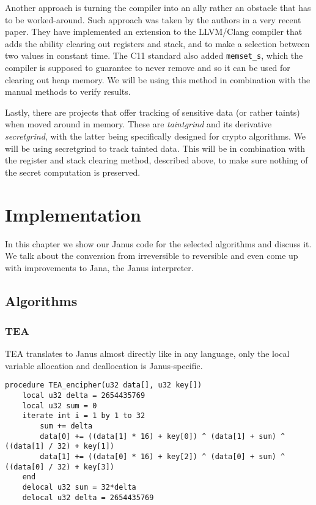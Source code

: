 \documentclass[a4paper,10pt,openright]{memoir}
\newcommand{\term}[1]{\textit{#1}}
\newcommand{\code}[1]{\texttt{#1}}
\begin{document}
Another approach is turning the compiler into an ally rather an 
obstacle that has to be worked-around. Such approach was taken by the 
authors in a very recent paper\cite{whatyouc}. They have implemented an 
extension to the LLVM/Clang compiler that adds the ability clearing out 
registers and stack, and to make a selection between two values in 
constant time. The C11 standard also added \code{memset\_s}, which the 
compiler is supposed to guarantee to never remove and so it can be used 
for clearing out heap memory. We will be using this method in 
combination with the manual methods to verify results.

Lastly, there are projects that offer tracking of sensitive data (or 
rather taints) when moved 
around in memory. These are \term{taintgrind} and its derivative 
\term{secretgrind}, with the latter being specifically designed for 
crypto algorithms. We will be using secretgrind to track tainted data. 
This will be in combination with the register and stack clearing 
method, described above, to make sure nothing of the secret computation 
is preserved.



\chapter{Implementation}

In this chapter we show our Janus code for the selected algorithms and 
discuss it. We talk about the conversion from irreversible to 
reversible and even come up with improvements to Jana, the Janus 
interpreter.


\section{Algorithms}

\subsection{TEA}
\label{sec:impl:tea}

TEA translates to Janus almost directly like in any language, only the 
local variable allocation and deallocation is Janus-specific.

\begin{lstlisting}[language=Janus]
procedure TEA_encipher(u32 data[], u32 key[])
    local u32 delta = 2654435769
    local u32 sum = 0
    iterate int i = 1 by 1 to 32
        sum += delta
        data[0] += ((data[1] * 16) + key[0]) ^ (data[1] + sum) ^ ((data[1] / 32) + key[1])
        data[1] += ((data[0] * 16) + key[2]) ^ (data[0] + sum) ^ ((data[0] / 32) + key[3])
    end
    delocal u32 sum = 32*delta
    delocal u32 delta = 2654435769
\end{lstlisting}
\end{document}
